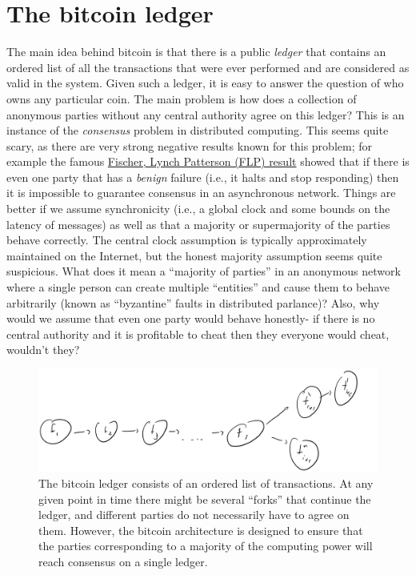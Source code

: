 \section{The bitcoin ledger}\label{The-bitcoin-ledger}

The main idea behind bitcoin is that there is a public \emph{ledger}
that contains an ordered list of all the transactions that were ever
performed and are considered as valid in the system. Given such a
ledger, it is easy to answer the question of who owns any particular
coin. The main problem is how does a collection of anonymous parties
without any central authority agree on this ledger? This is an instance
of the \emph{consensus} problem in distributed computing. This seems
quite scary, as there are very strong negative results known for this
problem; for example the famous
\href{http://the-paper-trail.org/blog/a-brief-tour-of-flp-impossibility/}{Fischer,
Lynch Patterson (FLP) result} showed that if there is even one party
that has a \emph{benign} failure (i.e., it halts and stop responding)
then it is impossible to guarantee consensus in an asynchronous network.
Things are better if we assume synchronicity (i.e., a global clock and
some bounds on the latency of messages) as well as that a majority or
supermajority of the parties behave correctly. The central clock
assumption is typically approximately maintained on the Internet, but
the honest majority assumption seems quite suspicious. What does it mean
a ``majority of parties'' in an anonymous network where a single person
can create multiple ``entities'' and cause them to behave arbitrarily
(known as ``byzantine'' faults in distributed parlance)? Also, why would
we assume that even one party would behave honestly- if there is no
central authority and it is profitable to cheat then they everyone would
cheat, wouldn't they?


\begin{figure}
\centering
\includegraphics[width=\textwidth, height=0.25\paperheight, keepaspectratio]{../figure/bitcoin_ledger.jpg}
\caption{The bitcoin ledger consists of an ordered list of transactions.
At any given point in time there might be several ``forks'' that
continue the ledger, and different parties do not necessarily have to
agree on them. However, the bitcoin architecture is designed to ensure
that the parties corresponding to a majority of the computing power will
reach consensus on a single ledger.}
\label{ledgerfig}
\end{figure}

